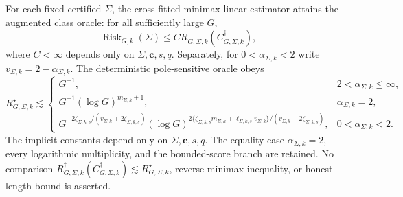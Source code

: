 For each fixed certified \(\Sigma\), the cross-fitted minimax-linear estimator attains the augmented class oracle: for all sufficiently large \(G\), \[\operatorname{Risk}_{G,k}(\Sigma)\le C R_{G,\Sigma,k}^{\dagger}(C_{G,\Sigma,k}^{\dagger}),\] where \(C<\infty\) depends only on \(\Sigma,\mathbf c,s,q\). Separately, for \(0<\alpha_{\Sigma,k}<2\) write \(v_{\Sigma,k}=2-\alpha_{\Sigma,k}\). The deterministic pole-sensitive oracle obeys \[R_{G,\Sigma,k}^{\star}\lesssim\begin{cases}G^{-1},&2<\alpha_{\Sigma,k}\le\infty,\\G^{-1}(\log G)^{m_{\Sigma,k}+1},&\alpha_{\Sigma,k}=2,\\G^{-2\zeta_{\Sigma,k,s}/(v_{\Sigma,k}+2\zeta_{\Sigma,k,s})}(\log G)^{2\{\zeta_{\Sigma,k,s}m_{\Sigma,k}+\ell_{\Sigma,k,s}v_{\Sigma,k}\}/(v_{\Sigma,k}+2\zeta_{\Sigma,k,s})},&0<\alpha_{\Sigma,k}<2.\end{cases}\] The implicit constants depend only on \(\Sigma,\mathbf c,s,q\). The equality case \(\alpha_{\Sigma,k}=2\), every logarithmic multiplicity, and the bounded-score branch are retained. No comparison \(R_{G,\Sigma,k}^{\dagger}(C_{G,\Sigma,k}^{\dagger})\lesssim R_{G,\Sigma,k}^{\star}\), reverse minimax inequality, or honest-length bound is asserted.